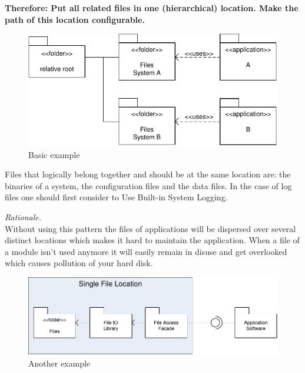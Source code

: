 \begin{center}
   
\end{center}

\textbf{Therefore: Put all related files in one (hierarchical) location. Make the path of this location configurable.}\\

\begin{figure}[h]
\centering
\includegraphics{patterns/singleFileLocationDiagram-01.pdf}
\caption{Basic example}
\label{fig:singleFileLocationDiagram-01}
\end{figure}

Files that logically belong together and should be at the same location are: the binaries of a system, the configuration files and the data files. In the case of log files one should first consider to {\sc Use Built-in System Logging}.

 
\begin{center}
   
\end{center}

\textit{Rationale.}\\
Without using this pattern the files of applications will be dispersed over several distinct locations which makes it hard to maintain the application. When a file of a module isn't used anymore it will easily remain in disuse and get overlooked which causes pollution of your hard disk.

\begin{figure}[h]
\centering
\includegraphics{patterns/singleFileLocationDiagram-02.pdf}
\caption{Another example}
\label{fig:singleFileLocationDiagram-02}
\end{figure}
